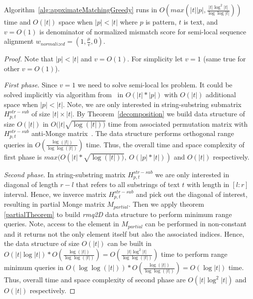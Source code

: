 \begin{theorem}
Algorithm~\ref{alg:appximateMatchingGreedy} runs in $O(max(|t||p|,\frac{|t| \log^2 |t|}{\log \log |t|} ))$ time and $O(|t|)$ space when $|p|<|t|$ where $p$ is pattern, $t$ is text, and $v=O(1)$ is denominator of normalized mismatch score for semi-local sequence alignment $w_{normalized} = (1,\frac{\mu}{v},0)$.
\end{theorem}
\begin{proof}
Note that $|p|<|t|$ and $v=O(1)$.
For simplicity let $v=1$ (same true for other $v=O(1)$).

\emph{First phase}. 
Since $v=1$ we need to solve semi-local lcs problem.
It could be solved implicitly via algorithm from~\cite{tiskin2008semi} in $O(|t| * |p|)$ with $O(|t|)$ additional space when $|p|<|t|$.
Note, we are only interested in string-substring submatrix $H^{str-sub}_{p,t}$ of size $|t| \times |t|$.
By Theorem~\ref{decomposition} we build data structure of size $O(|t|)$ in $O(|t|\sqrt{\log(|t|))}$ time from associated permutation matrix with $H^{str-sub}_{p,t}$ anti-Monge matrix~\cite{chan2010counting}.
The data structure performs orthogonal range queries in $O(\frac{\log (|t|)}{\log \log (|t|)})$ time.
Thus, the overall time and space complexity of first phase 
is $max(O(|t|*\sqrt{\log(|t|))},\ O(|p|*|t|))$ and
$O(|t|)$ respectively.

\emph{Second phase}.
In string-substring matrix $H^{str-sub}_{p,t}$ we are only interested in diagonal of length $r-l$ that refers to all substrings of text $t$ with length in $[l:r]$ interval. 
Hence, we inverce matrix  $H^{str-sub}_{p,t}$ and pick out the diagonal of interest, resulting in partial Monge matrix $M_{partial}$.
Then we apply theorem  \ref{partialTheorem} to build 
\emph{rmq2D} data structure to perform minimum range queries.
Note, access to the element in $M_{partial}$ can be performed in non-constant and it returns not the only element itself but also the associated indices.
Hence, the data structure of size $O(|t|)$ can be built in $O(|t| \log |t|)* O(\frac{\log (|t|)}{\log \log (|t|)}) = O(\frac{|t|\log^2 |t|}{\log \log (|t|)}) $ time to perform range minimum queries in $O(\log \log (|t|))*O(\frac{\log (|t|)}{\log \log (|t|)}) = O(\log |t|)$ time.
Thus, overall time and space complexity of second phase are $O(|t| \log^2 |t|)$ and $O(|t|)$ respectively.


\end{proof}
